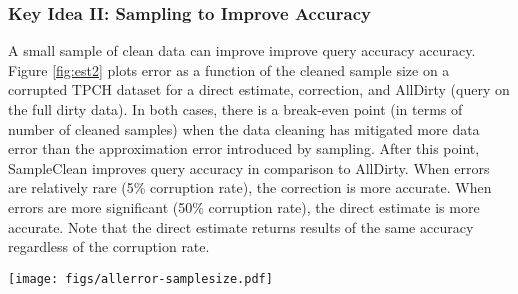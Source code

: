 \subsubsection{Key Idea II: Sampling to Improve Accuracy}
A small sample of clean data can improve improve query accuracy accuracy.
Figure \ref{fig:est2} plots error as a function of the cleaned sample size on a corrupted TPCH dataset for a direct estimate, correction, and AllDirty (query on the full dirty data).
In both cases, there is a break-even point (in terms of number of cleaned samples) when the data cleaning has mitigated more data error than the approximation error introduced by sampling.
After this point, SampleClean improves query accuracy in comparison to AllDirty.
When errors are relatively rare (5\% corruption rate), the correction is more accurate. 
When errors are more significant (50\% corruption rate), the direct estimate is more accurate.
Note that the direct estimate returns results of the same accuracy regardless of the corruption rate. 

\begin{SCfigure}
\texttt{[image: figs/allerror-samplesize.pdf]}
\caption{Comparison of the convergence of the methods on two TPC-H datasets of 6M tuples with simulated errors 50\% error and 5\% error. On the dataset with larger errors, the direct estimate gives a narrower confidence interval, and on the other the correction is more accurate. \label{fig:est2}}
\end{SCfigure}



